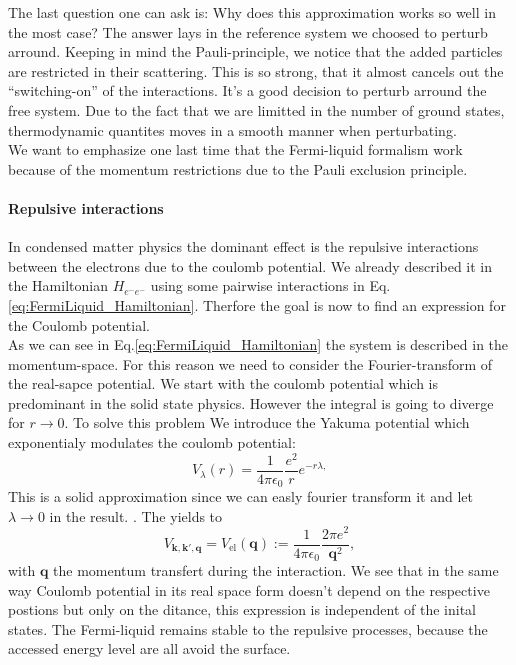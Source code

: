 \documentclass[../main.tex]{subfile}
\begin{document}
The last question one can ask is: Why does this approximation works so well in the most case? The answer lays in the reference system
we choosed to perturb arround. Keeping in mind the Pauli-principle, we notice that the added particles are restricted in their scattering.
This is so strong, that it almost cancels out the ``switching-on'' of the interactions. It's a good decision to perturb arround
the free system. Due to the fact that we are limitted in the number of ground states, thermodynamic quantites moves in a smooth manner
when perturbating.\\

We want to emphasize one last time that the Fermi-liquid formalism work because of the momentum restrictions
due to the Pauli exclusion principle.


\paragraph{Repulsive interactions}
In condensed matter physics the dominant effect is the repulsive interactions between the electrons due to the coulomb potential. We already described it in the Hamiltonian 
$H_{e^-e^-}$ using some pairwise interactions in Eq.\ref{eq:FermiLiquid_Hamiltonian}. Therfore the goal is now to find an expression for the Coulomb potential.\\

As we can see in Eq.\ref{eq:FermiLiquid_Hamiltonian} the system is described in the momentum-space. For this reason we need to 
consider the Fourier-transform of the real-sapce potential. We start with the coulomb potential which is predominant in the solid state physics.
However the integral is going to diverge for $r\rightarrow 0$. To solve this problem We
introduce the Yakuma potential which exponentialy modulates the coulomb potential:
\begin{equation}
    V_{\lambda}(r) = \frac{1}{4\pi\epsilon_0} \frac{e^2}{r} e^{-r\lambda,} \label{eq:Yakuma}
\end{equation}
This is a solid approximation since we can easly fourier transform it and let $\lambda\rightarrow 0$ in the result. .
The yields to
\begin{equation} \label{eq:Pot_repulsive_el}
    V_{\bm{k},\bm{k}',\bm{q}} = V_{\text{el}}(\bm{q}) := \frac{1}{4\pi\epsilon_0} \frac{2\pi e^2}{\bm{q}^2},
\end{equation}
with $\bm{q}$ the momentum transfert during the interaction. We see that in the same way Coulomb potential in its real
 space form doesn't depend on the respective postions but only on the ditance,
this expression is independent of the inital states. 
The Fermi-liquid remains stable to the repulsive processes, because the accessed energy level are all avoid the surface.\\
\end{document}
